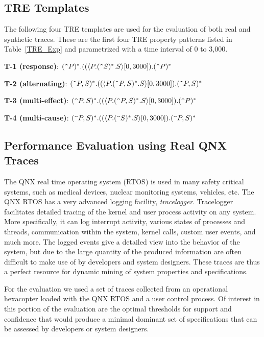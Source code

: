 \documentclass[]{sigplanconf}
\begin{document}
\subsection{TRE Templates}
The following four TRE templates are used for the evaluation of both real and synthetic traces. These are the first four TRE property patterns listed in Table~\ref{TRE_Exp} and parametrized with a time interval of 0 to 3,000.
\vspace{2mm}

\noindent \textbf{T-1 (response)}: $(\verb!^!P)^*.((\langle P.(\verb!^!S)^*.S\rangle[0, 3000]).(\verb!^!P)^*$

\noindent \textbf{T-2 (alternating)}: $(\verb!^!P,S)^*.((\langle P.(\verb!^!P,S)^*.S\rangle[0, 3000]).(\verb!^!P,S)^*$

\noindent \textbf{T-3 (multi-effect)}: $(\verb!^!P,S)^*.((\langle P.(\verb!^!P,S)^*.S\rangle[0, 3000]).(\verb!^!P)^*$

\noindent \textbf{T-4 (multi-cause)}: $(\verb!^!P,S)^*.((\langle P.(\verb!^!S)^*.S\rangle[0, 3000]).(\verb!^!P,S)^*$


\subsection{Performance Evaluation using Real QNX Traces}

The QNX real time operating system (RTOS) is used in many safety critical systems, such as medical devices, nuclear monitoring systems, vehicles, etc. The QNX RTOS has a very advanced logging facility, \emph{tracelogger}. Tracelogger facilitates detailed tracing of the kernel and user process activity on any system. More specifically, it can log interrupt activity, various states of processes and threads, communication within the system, kernel calls, custom user events, and much more. The logged events give a detailed view into the behavior of the system, but due to the large quantity of the produced information are often difficult to make use of by developers and system designers. These traces are thus a perfect resource for dynamic mining of system properties and specifications.

For the evaluation we used a set of traces collected from an operational hexacopter loaded with the QNX RTOS and a user control process. Of interest in this portion of the evaluation are the optimal thresholds for support and confidence that would produce a minimal dominant set of specifications that can be assessed by developers or system designers.
\end{document}

